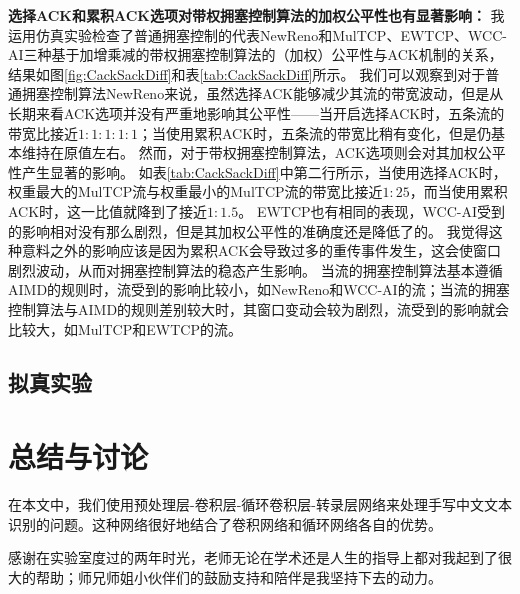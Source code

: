 \documentclass[winfonts]{njuthesis}
\begin{document}
\textbf{选择ACK和累积ACK选项对带权拥塞控制算法的加权公平性也有显著影响：}
我运用仿真实验检查了普通拥塞控制的代表NewReno和MulTCP、EWTCP、WCC-AI三种基于加增乘减的带权拥塞控制算法的（加权）公平性与ACK机制的关系，结果如图\ref{fig:CackSackDiff}和表\ref{tab:CackSackDiff}所示。
我们可以观察到对于普通拥塞控制算法NewReno来说，虽然选择ACK能够减少其流的带宽波动，但是从长期来看ACK选项并没有严重地影响其公平性——当开启选择ACK时，五条流的带宽比接近$1:1:1:1:1$；当使用累积ACK时，五条流的带宽比稍有变化，但是仍基本维持在原值左右。
然而，对于带权拥塞控制算法，ACK选项则会对其加权公平性产生显著的影响。
如表\ref{tab:CackSackDiff}中第二行所示，当使用选择ACK时，权重最大的MulTCP流与权重最小的MulTCP流的带宽比接近$1:25$，而当使用累积ACK时，这一比值就降到了接近$1:1.5$。
EWTCP也有相同的表现，WCC-AI受到的影响相对没有那么剧烈，但是其加权公平性的准确度还是降低了的。
我觉得这种意料之外的影响应该是因为累积ACK会导致过多的重传事件发生\cite{Mathis1996SACK}，这会使窗口剧烈波动，从而对拥塞控制算法的稳态产生影响。
当流的拥塞控制算法基本遵循AIMD的规则时，流受到的影响比较小，如NewReno和WCC-AI的流；当流的拥塞控制算法与AIMD的规则差别较大时，其窗口变动会较为剧烈，流受到的影响就会比较大，如MulTCP和EWTCP的流。

\section{拟真实验}
\label{sec:emulation}

\chapter{总结与讨论}
在本文中，我们使用预处理层-卷积层-循环卷积层-转录层网络来处理手写中文文本识别的问题。这种网络很好地结合了卷积网络和循环网络各自的优势。



\begin{acknowledgement}
感谢在实验室度过的两年时光，老师无论在学术还是人生的指导上都对我起到了很大的帮助；师兄师姐小伙伴们的鼓励支持和陪伴是我坚持下去的动力。
\end{acknowledgement}

\end{document}
